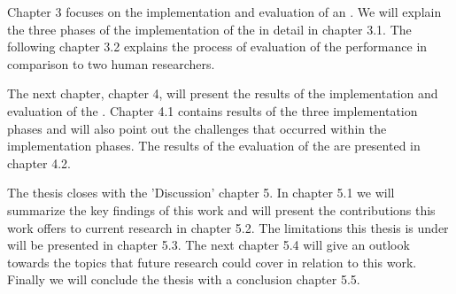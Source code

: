 Chapter 3 focuses on the implementation and evaluation of an \aiprat.
We will explain the three phases of the implementation of the \aiprat in detail in chapter 3.1.
The following chapter 3.2 explains the process of evaluation of the \aiprat performance in comparison to two human researchers.

The next chapter, chapter 4, will present the results of the implementation and evaluation of the \aiprat.
Chapter 4.1 contains results of the three implementation phases and will also point out the challenges that occurred within the implementation phases.
The results of the evaluation of the \aiprat are presented in chapter 4.2.

The thesis closes with the 'Discussion' chapter 5. 
In chapter 5.1 we will summarize the key findings of this work and will present the contributions this work offers to current research in chapter 5.2.
The limitations this thesis is under will be presented in chapter 5.3.
The next chapter 5.4 will give an outlook towards the topics that future research could cover in relation to this work.
Finally we will conclude the thesis with a conclusion chapter 5.5.
